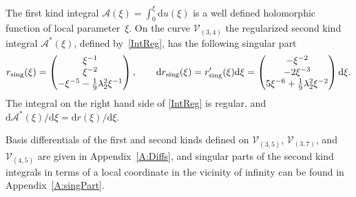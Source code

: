 \documentclass[11pt]{article}
\numberwithin{equation}{section}
\newcommand{\rmd}{\mathrm{d}}
\begin{document}
The first kind integral $\mathcal{A}(\xi)=\int_0^{\xi} \rmd u(\xi)$ is a well defined holomorphic function {of local parameter~$\xi$}. On the curve $\mathcal{V}_{(3,4)}$ the regularized second kind integral $\mathcal{A}^\ast(\xi)$, defined by~\eqref{IntReg}, has the following singular part
\begin{gather*}%
 r_{\textup{sing}} (\xi) =\begin{pmatrix} \xi^{-1} \\ \xi^{-2}\\ - \xi^{-5} - \frac{1}{9}\lambda_2^2 \xi^{-1}\end{pmatrix} ,\qquad
 \rmd r_{\textup{sing}} (\xi) = r'_{\textup{sing}} (\xi) \rmd \xi = \begin{pmatrix} - \xi^{-2} \\ - 2 \xi^{-3}\\
 5 \xi^{-6} + \frac{1}{9} \lambda_2^2 \xi^{-2}\end{pmatrix} \rmd \xi.
\end{gather*}
The integral on the right hand side of \eqref{IntReg} is regular, and $\rmd \mathcal{A}^\ast(\xi)/\rmd \xi = \rmd r(\xi)/\rmd \xi$.

Basis differentials of the first and second kinds defined on $\mathcal{V}_{(3,5)}$, $\mathcal{V}_{(3,7)}$, and $\mathcal{V}_{(4,5)}$ are given in Appendix~\ref{A:Diffs}, and singular parts of the second kind integrals in terms of a local coordinate in the vicinity of infinity can be found in Appendix~\ref{A:singPart}.
\end{document}
